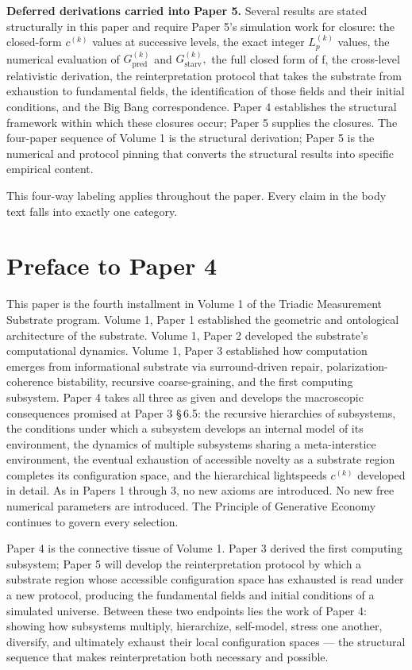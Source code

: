 \documentclass[11pt,oneside]{report}
\theoremstyle{definition}
\theoremstyle{remark}
\begin{document}
\textbf{Deferred derivations carried into Paper 5.} Several results are
stated structurally in this paper and require Paper 5's simulation work
for closure: the closed-form \ensuremath{c^{(k)}} values at successive levels, the
exact integer \ensuremath{L_{p}^{(k)}} values, the numerical evaluation of \ensuremath{G_{\mathrm{pred}}^{(k)}}
and \ensuremath{G_{\mathrm{starv}}^{(k)},} the full closed form of f, the cross-level
relativistic derivation, the reinterpretation protocol that takes the
substrate from exhaustion to fundamental fields, the identification of
those fields and their initial conditions, and the Big Bang
correspondence. Paper 4 establishes the structural framework within
which these closures occur; Paper 5 supplies the closures. The
four-paper sequence of Volume 1 is the structural derivation; Paper 5 is
the numerical and protocol pinning that converts the structural results
into specific empirical content.

This four-way labeling applies throughout the paper. Every claim in the
body text falls into exactly one category.

\section*{Preface to Paper 4}

This paper is the fourth installment in Volume 1 of the Triadic
Measurement Substrate program. Volume 1, Paper 1 established the
geometric and ontological architecture of the substrate. Volume 1, Paper
2 developed the substrate's computational dynamics. Volume 1, Paper 3
established how computation emerges from informational substrate via
surround-driven repair, polarization-coherence bistability, recursive
coarse-graining, and the first computing subsystem. Paper 4 takes all
three as given and develops the macroscopic consequences promised at
Paper 3 \S\,6.5: the recursive hierarchies of subsystems, the conditions
under which a subsystem develops an internal model of its environment,
the dynamics of multiple subsystems sharing a meta-interstice
environment, the eventual exhaustion of accessible novelty as a
substrate region completes its configuration space, and the hierarchical
lightspeeds \ensuremath{c^{(k)}} developed in detail. As in Papers 1 through 3, no
new axioms are introduced. No new free numerical parameters are
introduced. The Principle of Generative Economy continues to govern
every selection.

Paper 4 is the connective tissue of Volume 1. Paper 3 derived the first
computing subsystem; Paper 5 will develop the reinterpretation protocol
by which a substrate region whose accessible configuration space has
exhausted is read under a new protocol, producing the fundamental fields
and initial conditions of a simulated universe. Between these two
endpoints lies the work of Paper 4: showing how subsystems multiply,
hierarchize, self-model, stress one another, diversify, and ultimately
exhaust their local configuration spaces --- the structural sequence
that makes reinterpretation both necessary and possible.
\end{document}
